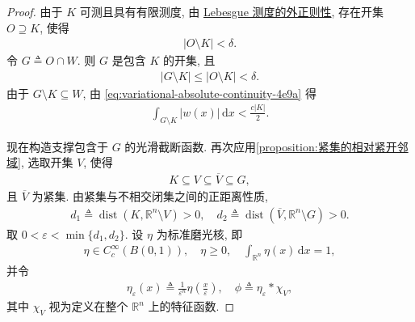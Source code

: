 \documentclass[../../main.tex]{subfiles}
\begin{document}
\begin{proof}
由于 $K$ 可测且具有有限测度, 由 \hyperref[Real Analysis-theorem:定理2.14]{Lebesgue 测度的外正则性}, 存在开集 $O\supseteq K$, 使得
\begin{align*}
|O\setminus K|<\delta.
\end{align*}
令 $G\triangleq O\cap W$. 则 $G$ 是包含 $K$ 的开集, 且
\begin{align*}
|G\setminus K|
\leqslant |O\setminus K|
<\delta.
\end{align*}
由于 $G\setminus K\subseteq W$, 由 \eqref{eq:variational-absolute-continuity-4e9a} 得
\begin{align}
\int_{G\setminus K}|w(x)|\,\mathrm{d}x
<\frac{c|K|}{2}.
\label{eq:variational-small-error-8c3d}
\end{align}

现在构造支撑包含于 $G$ 的光滑截断函数. 再次应用\cref{proposition:紧集的相对紧开邻域}, 选取开集 $V$, 使得
\begin{align*}
K\subseteq V\subseteq\overline{V}\subseteq G,
\end{align*}
且 $\overline{V}$ 为紧集. 由紧集与不相交闭集之间的正距离性质,
\begin{align*}
d_1\triangleq
\operatorname{dist}(K,\mathbb{R}^n\setminus V)>0,\quad
d_2\triangleq
\operatorname{dist}(\overline{V},\mathbb{R}^n\setminus G)>0.
\end{align*}
取 $0<\varepsilon<\min\{d_1,d_2\}$. 设 $\eta$ 为标准磨光核, 即
\begin{align*}
\eta\in C_c^\infty(B(0,1)),
\quad \eta\geqslant 0,
\quad \int_{\mathbb{R}^n}\eta(x)\,\mathrm{d}x=1,
\end{align*}
并令
\begin{align*}
\eta_\varepsilon(x)
\triangleq
\frac{1}{\varepsilon^n}
\eta\left(\frac{x}{\varepsilon}\right),\quad
\phi\triangleq\eta_\varepsilon*\chi_V,
\end{align*}
其中 $\chi_V$ 视为定义在整个 $\mathbb{R}^n$ 上的特征函数.


\end{proof}
\end{document}
